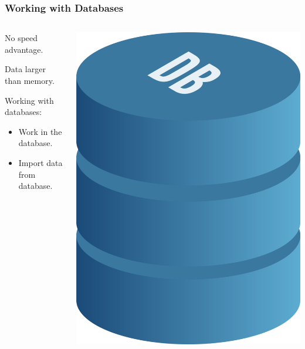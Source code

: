 \documentclass{beamer}\usepackage[]{graphicx}\usepackage[]{color}
\begin{document}
\begin{frame}[c]
\frametitle{Working with Databases}

\begin{columns}[T]
	\begin{column}{.5\textwidth}
		No speed advantage.\vspace{1em}

		Data larger than memory.\vspace{1em}

		Working with databases:
		\begin{itemize}
			\item Work in the database.
			\item Import data from database.
		\end{itemize}
		\vfill
	\end{column}

	\begin{column}{.5\textwidth}
		\includegraphics[width=.8\textwidth]{./figures/Database.png}
	\end{column}

\end{columns}

\end{frame}
\end{document}

